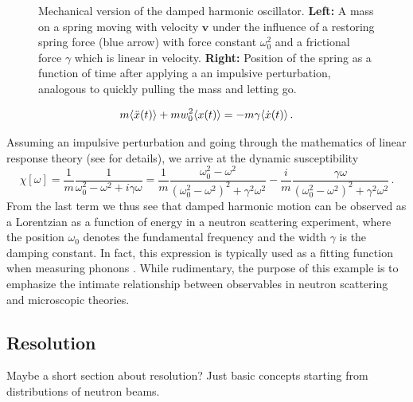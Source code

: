 \begin{figure}[]
	\centering
	\hspace{4mm}
	\caption[DHO schematic]{Mechanical version of the damped harmonic oscillator. \textbf{Left:} A mass on a spring moving with velocity $\bm{v}$ under the influence of a restoring spring force (blue arrow) with force constant $\omega_0^2$ and a frictional force $\gamma$ which is linear in velocity. \textbf{Right:} Position of the spring as a function of time after applying a an impulsive perturbation, analogous to quickly pulling the mass and letting go.}
	\label{fig:dho_chi}
\end{figure}

\[ m \langle \ddot{x}(t) \rangle + m w_0^2 \langle x(t) \rangle = - m\gamma\langle \dot{x}(t) \rangle \, . \]

\noindent Assuming an impulsive perturbation and going through the mathematics of linear response theory (see \cite{Lovesey1984} for details), we arrive at the dynamic susceptibility
%
\[ \chi[\omega] = \frac{1}{m}\frac{1}{\omega_0^2 - \omega^2 + i\gamma\omega} = \frac{1}{m} \frac{\omega_0^2 - \omega^2}{(\omega_0^2-\omega^2)^2 + \gamma^2\omega^2} - \frac{i}{m}\frac{\gamma\omega}{(\omega_0^2-\omega^2)^2 + \gamma^2\omega^2} \, . \]
%
From the last term we thus see that damped harmonic motion can be observed as a Lorentzian as a function of energy in a neutron scattering experiment, where the position $\omega_0$ denotes the fundamental frequency and the width $\gamma$ is the damping constant. In fact, this expression is typically used as a fitting function when measuring phonons \cite{Fak1997}. While rudimentary, the purpose of this example is to emphasize the intimate relationship between observables in neutron scattering and microscopic theories.

\subsection{Resolution}
Maybe a short section about resolution? Just basic concepts starting from distributions of neutron beams.

